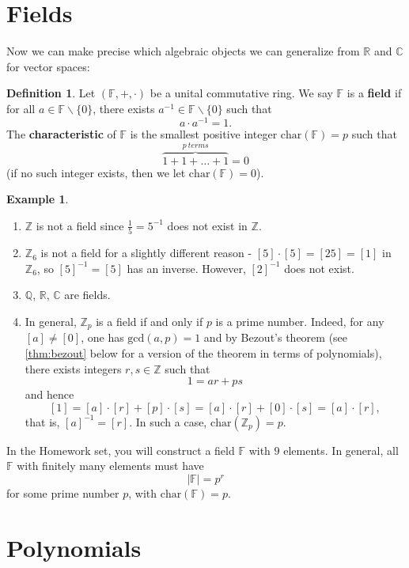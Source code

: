 \documentclass[11pt,openany]{book}
\theoremstyle{plain}
\theoremstyle{definition}
\newtheorem{definition}[definition]{Definition}
\newtheorem{example}[example]{Example}
\theoremstyle{remark}
\begin{document}
\section{Fields}
Now we can make precise which algebraic objects we can generalize from $\mathbb{R}$ and $\mathbb{C}$ for vector spaces:
\begin{definition}
    Let $(\mathbb{F},+,\cdot)$ be a unital commutative ring. We say $\mathbb{F}$ is a {\bf field} if for all $a \in \mathbb{F} \backslash \{0\}$, there exists $a^{-1} \in \mathbb{F} \backslash \{0\}$ such that
    $$a \cdot a^{-1} = 1.$$
    The {\bf characteristic} of $\mathbb{F}$ is the smallest positive integer $\mathrm{char}(\mathbb{F}) = p$ such that 
    $$\overbrace{1+1+ \dots + 1}^{p\ terms} = 0$$ 
    (if no such integer exists, then we let $\mathrm{char}(\mathbb{F}) = 0$).
\end{definition}

\begin{example}
    \begin{enumerate}
        \item $\mathbb{Z}$ is not a field since $\frac{1}{5} = 5^{-1}$ does not exist in $\mathbb{Z}$. 
        \item $\mathbb{Z}_6$ is not a field for a slightly different reason - $[5] \cdot [5] = [25] = [1]$ in $\mathbb{Z}_6$, so $[5]^{-1} = [5]$ has an inverse. However, $[2]^{-1}$ does not exist.
        \item  $\mathbb{Q}$, $\mathbb{R}$, $\mathbb{C}$ are fields.
        \item In general, $\mathbb{Z}_p$ is a field if and only if $p$ is a prime number. Indeed, for any $[a] \neq [0]$, one has $\mathrm{gcd}(a,p) = 1$ and by Bezout's theorem (see \autoref{thm:bezout} below for a version of the theorem in terms of polynomials), there exists integers $r, s \in \mathbb{Z}$ such that
        $$1 = ar + ps$$
        and hence 
        $$[1] = [a]\cdot [r] + [p]\cdot [s] = [a]\cdot [r] + [0]\cdot [s] = [a]\cdot [r],$$
        that is, $[a]^{-1} = [r]$.
        In such a case, $\mathrm{char}(\mathbb{Z}_p) = p$. 
    \end{enumerate}
\end{example}
In the Homework set, you will construct a field $\mathbb{F}$ with $9$ elements. In general, all $\mathbb{F}$ with finitely many elements must have
$$|\mathbb{F}| = p^r$$
for some prime number $p$, with $\mathrm{char}(\mathbb{F}) = p$.

\section{Polynomials}
\end{document}
